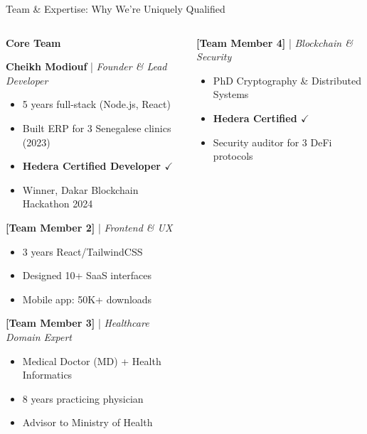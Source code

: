 \documentclass[aspectratio=169,xcolor=dvipsnames,20pt]{beamer}
\begin{document}
\begin{frame}{Team \& Expertise: Why We're Uniquely Qualified}

  \begin{columns}[T]
    \begin{column}{0.5\textwidth}
      \textbf{\textcolor{FadjmaBlue}{Core Team}}

      \textbf{Cheikh Modiouf} | \textit{Founder \& Lead Developer}
      \begin{itemize}
        \item 5 years full-stack (Node.js, React)
        \item Built ERP for 3 Senegalese clinics (2023)
        \item \textcolor{SuccessGreen}{\textbf{Hedera Certified Developer $\checkmark$}}
        \item Winner, Dakar Blockchain Hackathon 2024
      \end{itemize}

      \vspace{0.2cm}

      \textbf{[Team Member 2]} | \textit{Frontend \& UX}
      \begin{itemize}
        \item 3 years React/TailwindCSS
        \item Designed 10+ SaaS interfaces
        \item Mobile app: 50K+ downloads
      \end{itemize}

      \vspace{0.2cm}

      \textbf{[Team Member 3]} | \textit{Healthcare Domain Expert}
      \begin{itemize}
        \item Medical Doctor (MD) + Health Informatics
        \item 8 years practicing physician
        \item Advisor to Ministry of Health
      \end{itemize}
    \end{column}

    \begin{column}{0.5\textwidth}
      \textbf{[Team Member 4]} | \textit{Blockchain \& Security}
      \begin{itemize}
        \item PhD Cryptography \& Distributed Systems
        \item \textcolor{SuccessGreen}{\textbf{Hedera Certified $\checkmark$}}
        \item Security auditor for 3 DeFi protocols
      \end{itemize}


\end{column}
\end{columns}
\end{frame}
\end{document}

